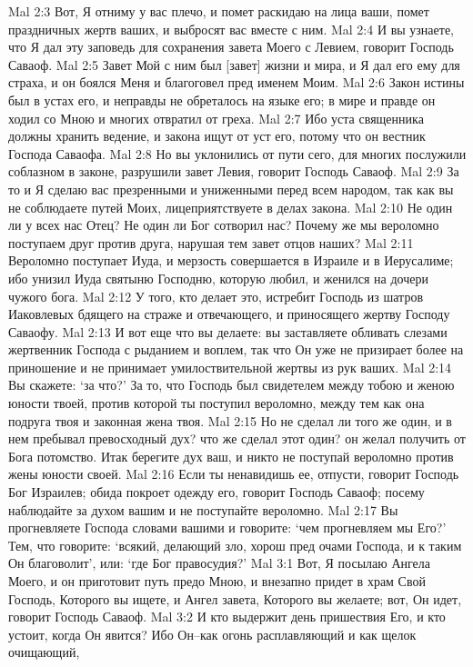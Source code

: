 Mal 2:3  Вот, Я отниму у вас плечо, и помет раскидаю на лица ваши, помет праздничных жертв ваших, и выбросят вас вместе с ним.
Mal 2:4  И вы узнаете, что Я дал эту заповедь для сохранения завета Моего с Левием, говорит Господь Саваоф.
Mal 2:5  Завет Мой с ним был [завет] жизни и мира, и Я дал его ему для страха, и он боялся Меня и благоговел пред именем Моим.
Mal 2:6  Закон истины был в устах его, и неправды не обреталось на языке его; в мире и правде он ходил со Мною и многих отвратил от греха.
Mal 2:7  Ибо уста священника должны хранить ведение, и закона ищут от уст его, потому что он вестник Господа Саваофа.
Mal 2:8  Но вы уклонились от пути сего, для многих послужили соблазном в законе, разрушили завет Левия, говорит Господь Саваоф.
Mal 2:9  За то и Я сделаю вас презренными и униженными перед всем народом, так как вы не соблюдаете путей Моих, лицеприятствуете в делах закона.
Mal 2:10  Не один ли у всех нас Отец? Не один ли Бог сотворил нас? Почему же мы вероломно поступаем друг против друга, нарушая тем завет отцов наших?
Mal 2:11  Вероломно поступает Иуда, и мерзость совершается в Израиле и в Иерусалиме; ибо унизил Иуда святыню Господню, которую любил, и женился на дочери чужого бога.
Mal 2:12  У того, кто делает это, истребит Господь из шатров Иаковлевых бдящего на страже и отвечающего, и приносящего жертву Господу Саваофу.
Mal 2:13  И вот еще что вы делаете: вы заставляете обливать слезами жертвенник Господа с рыданием и воплем, так что Он уже не призирает более на приношение и не принимает умилоствительной жертвы из рук ваших.
Mal 2:14  Вы скажете: `за что?' За то, что Господь был свидетелем между тобою и женою юности твоей, против которой ты поступил вероломно, между тем как она подруга твоя и законная жена твоя.
Mal 2:15  Но не сделал ли того же один, и в нем пребывал превосходный дух? что же сделал этот один? он желал получить от Бога потомство. Итак берегите дух ваш, и никто не поступай вероломно против жены юности своей.
Mal 2:16  Если ты ненавидишь ее, отпусти, говорит Господь Бог Израилев; обида покроет одежду его, говорит Господь Саваоф; посему наблюдайте за духом вашим и не поступайте вероломно.
Mal 2:17  Вы прогневляете Господа словами вашими и говорите: `чем прогневляем мы Его?' Тем, что говорите: `всякий, делающий зло, хорош пред очами Господа, и к таким Он благоволит', или: `где Бог правосудия?'
Mal 3:1  Вот, Я посылаю Ангела Моего, и он приготовит путь предо Мною, и внезапно придет в храм Свой Господь, Которого вы ищете, и Ангел завета, Которого вы желаете; вот, Он идет, говорит Господь Саваоф.
Mal 3:2  И кто выдержит день пришествия Его, и кто устоит, когда Он явится? Ибо Он--как огонь расплавляющий и как щелок очищающий,
